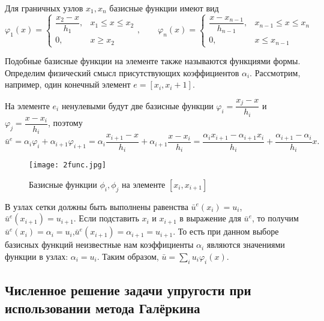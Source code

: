 \documentclass[a4paper,14pt]{extarticle}
\begin{document}

Для граничных узлов $x_1,x_n$ базисные функции имеют вид
\[
\varphi_1(x)=
\begin{cases}
\dfrac{x_2-x}{h_1}, & x_1\leq x\leq x_2 \\
0, & x \geq x_2
\end{cases},
\qquad \varphi_n(x)=
\begin{cases}
\dfrac{x-x_{n-1}}{h_{n-1}}, & x_{n-1}\leq x\leq x_n \\
0, & x\leq x_{n-1} 
\end{cases}
\]

Подобные базисные функции на элементе также называются функциями формы. Определим физический смысл присутствующих коэффициентов $\alpha_i$. Рассмотрим, например, один конечный элемент $e=[x_i,x_i+1]$. 

\newpage
На элементе $e_i$ ненулевыми будут две базисные функции $\varphi_i=\dfrac{x_j-x}{h_i}$ и $\varphi_j=\dfrac{x-x_i}{h_i}$, поэтому 
\[
\bar{u}^e=\alpha_i \varphi_i+\alpha_{i+1} \varphi_{i+1}=\alpha_i \frac{x_{i+1}-x}{h_i}+\alpha_{i+1} \frac{x-x_i}{h_i}=\frac{\alpha_i x_{i+1}-\alpha_{i+1} x_i}{h_i}+\frac{\alpha_{i+1}-\alpha_i}{h_i}x.
\]

\begin{figure}[ht]
\begin{center}
\texttt{[image: 2func.jpg]}
\caption{Базисные функции $\phi_i,\phi_j$ на элементе $[x_i,x_{i+1}]$}
\end{center}
\end{figure}

В узлах сетки должны быть выполнены равенства $\bar{u}^e (x_i)=u_i$,$\bar{u}^e (x_{i+1})=u_{i+1}$. Если подставить $x_i$ и $x_{i+1}$ в выражение для $\bar{u}^e$, то получим $\bar{u}^e (x_i)=\alpha_i=u_i$,$\bar{u}^e (x_{i+1})=\alpha_{i+1}=u_{i+1}$. То есть при данном выборе базисных функций неизвестные нам коэффициенты $\alpha_i$ являются значениями функции в узлах: $\alpha_i=u_i$. Таким образом, $\bar{u}=\sum\limits_i u_i \varphi_i(x)$.

\newpage

\subsection{Численное решение задачи упругости при использовании метода Галёркина}
\end{document}
